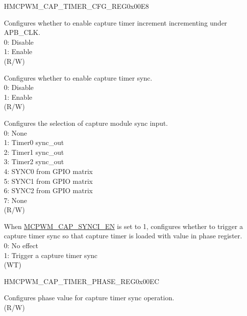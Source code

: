 \begin{register}{H}{MCPWM\_CAP\_TIMER\_CFG\_REG}{0x00E8}\label{regdesc:MCPWMCAPTIMERCFGREG}
%
%
%
%
%
\regnewline%
\begin{regdesc}\begin{reglist}
\label{fielddesc:MCPWMCAPTIMEREN}\item [MCPWM\_CAP\_TIMER\_EN] Configures whether to enable capture timer increment incrementing under APB\_CLK.\\0: Disable\\1: Enable \\(R/W)
\label{fielddesc:MCPWMCAPSYNCIEN}\item [MCPWM\_CAP\_SYNCI\_EN] Configures whether to enable capture timer sync.\\0: Disable\\1: Enable \\(R/W)
\label{fielddesc:MCPWMCAPSYNCISEL}\item [MCPWM\_CAP\_SYNCI\_SEL] Configures the selection of capture module sync input.\\0: None\\1: Timer0 sync\_out\\2: Timer1 sync\_out\\3: Timer2 sync\_out\\4: SYNC0 from GPIO matrix\\5: SYNC1 from GPIO matrix\\6: SYNC2 from GPIO matrix\\7: None \\(R/W)
\label{fielddesc:MCPWMCAPSYNCSW}\item [MCPWM\_CAP\_SYNC\_SW] When \hyperref[fielddesc:MCPWMCAPSYNCIEN]{MCPWM\_CAP\_SYNCI\_EN} is set to 1, configures whether to trigger a capture timer sync so that capture timer is loaded with value in phase register. \\
0: No effect\\
1: Trigger a capture timer sync\\
(WT)
\end{reglist}\end{regdesc}
\end{register}


\begin{register}{H}{MCPWM\_CAP\_TIMER\_PHASE\_REG}{0x00EC}\label{regdesc:MCPWMCAPTIMERPHASEREG}
%
\regnewline%
\begin{regdesc}\begin{reglist}
\label{fielddesc:MCPWMCAPPHASE}\item [MCPWM\_CAP\_PHASE] Configures phase value for capture timer sync operation. \\(R/W)
\end{reglist}\end{regdesc}
\end{register}


